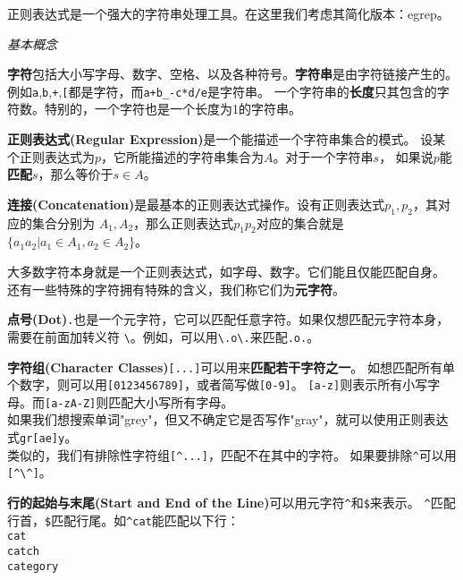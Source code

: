 \vspace{6pt} \par
正则表达式是一个强大的字符串处理工具。在这里我们考虑其简化版本：egrep。
\par \vspace{6pt}
{\itshape{\large 基本概念}} \vspace{6pt} \par 


\textbf{字符}包括大小写字母、数字、空格、以及各种符号。\textbf{字符串}是由字符链接产生的。
例如\verb#a#,\verb#b#,\verb#+#,\verb#[#都是字符，而\verb#a+b_-c*d/e#是字符串。
一个字符串的\textbf{长度}只其包含的字符数。特别的，一个字符也是一个长度为1的字符串。
\par
\textbf{正则表达式(Regular Expression)}是一个能描述一个字符串集合的模式。
设某个正则表达式为$p$，它所能描述的字符串集合为$A$。对于一个字符串$s$，
如果说$p$能\textbf{匹配}$s$，那么等价于$s \in A$。
\par
\textbf{连接(Concatenation)}是最基本的正则表达式操作。设有正则表达式$p_1,p_2$，其对应的集合分别为
$A_1, A_2$，那么正则表达式$p_1p_2$对应的集合就是$\{ a_1a_2 | a_1 \in A_1, a_2 \in A_2 \}$。
\par
大多数字符本身就是一个正则表达式，如字母、数字。它们能且仅能匹配自身。
还有一些特殊的字符拥有特殊的含义，我们称它们为\textbf{元字符}。
\par
\textbf{点号(Dot)}\verb#.#也是一个元字符，它可以匹配任意字符。如果仅想匹配元字符本身，需要在前面加转义符
\verb#\#。例如，可以用\verb#\.o\.#来匹配\verb#.o.#。
\par 
\textbf{字符组(Character Classes)}\verb#[...]#可以用来\textbf{匹配若干字符之一}。
如想匹配所有单个数字，则可以用\verb#[0123456789]#，或者简写做\verb#[0-9]#。
\verb#[a-z]#则表示所有小写字母。而\verb#[a-zA-Z]#则匹配大小写所有字母。 \\
如果我们想搜索单词"grey"，但又不确定它是否写作"gray"，就可以使用正则表达式\verb#gr[ae]y#。
\\ 类似的，我们有排除性字符组\verb#[^...]#，匹配不在其中的字符。
如果要排除\verb#^#可以用\verb#[^\^]#。

\par
\textbf{行的起始与末尾(Start and End of the Line)}可以用元字符\verb#^#和\verb#$#来表示。
\verb#^#匹配行首，\verb#$#匹配行尾。如\verb#^cat#能匹配以下行：\\
\verb#cat# \\
\verb#catch# \\
\verb#category# \\

